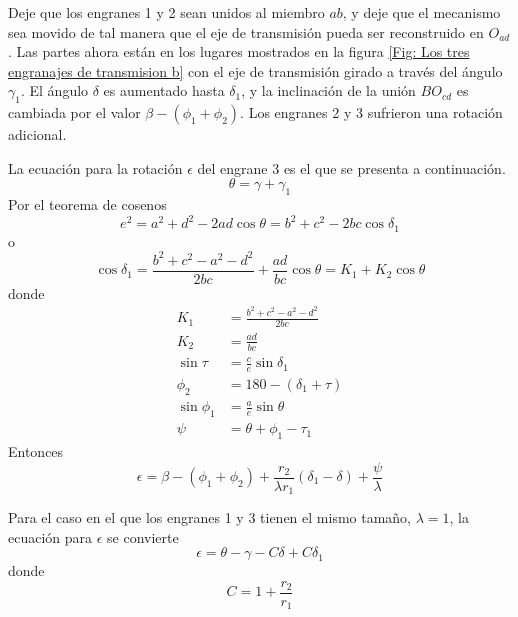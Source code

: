 \documentclass[12pt, final]{extarticle}
\begin{document}
Deje que los engranes 1 y 2 sean unidos al miembro $ab$, y deje que el mecanismo
sea movido de tal manera que el eje de transmisión pueda ser reconstruido en
$O_{ad}$. Las partes ahora están en los lugares mostrados en la figura
\ref{Fig: Los tres engranajes de transmision b} con el eje de transmisión
girado a través del ángulo $\gamma_{1}$. El ángulo $\delta$ es aumentado hasta
$\delta_{1}$, y la inclinación de la unión $BO_{cd}$ es cambiada por el valor
$\beta - (\phi_{1} + \phi_{2})$. Los engranes 2 y 3 sufrieron una rotación
adicional.

La ecuación para la rotación $\epsilon$ del engrane 3 es el que se presenta a
continuación.
\begin{equation}
    \theta = \gamma + \gamma_{1}
\end{equation}
Por el teorema de cosenos
\begin{equation}
    e^2 = a^2 + d^2 - 2ad\cos\theta = b^2 + c^2 - 2bc\cos\delta_{1}
\end{equation}
o
\begin{equation}
    \cos\delta_{1} = \frac{b^2 + c^2 - a^2 - d^2}{2bc} + \frac{ad}{bc}\cos\theta
    = K_{1} + K_{2}\cos\theta
    \label{Eq: cos delta1}
\end{equation}
donde
\begin{align}
    K_{1} &= \frac{b^2 + c^2 - a^2 - d^2}{2bc} \\
    K_{2} &= \frac{ad}{bc} \\
    \sin\tau &= \frac{c}{e}\sin\delta_{1} \\
    \phi_{2} &= 180 - (\delta_{1} + \tau) \\
    \sin\phi_{1} &= \frac{a}{e}\sin\theta \\
    \psi &= \theta + \phi_{1} - \tau_{1}
\end{align}
Entonces
\begin{equation}
    \epsilon = \beta - (\phi_{1} + \phi_{2})
    + \frac{r_{2}}{\lambda r_{1}}(\delta_{1} - \delta) + \frac{\psi}{\lambda}
\end{equation}

Para el caso en el que los engranes 1 y 3 tienen el mismo tamaño, $\lambda=1$,
la ecuación para $\epsilon$ se convierte
\begin{equation}
    \epsilon = \theta - \gamma - C\delta + C\delta_{1}
    \label{Eq: epsilon theta menos gamma}
\end{equation}
donde
\begin{equation}
    C = 1 + \frac{r_{2}}{r_{1}}
\end{equation}
\end{document}
